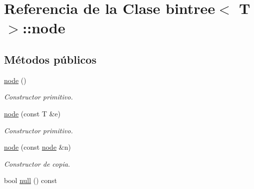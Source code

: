 \hypertarget{classbintree_1_1node}{}\section{Referencia de la Clase bintree$<$ T $>$\+:\+:node}
\label{classbintree_1_1node}
\subsection*{Métodos públicos}
\begin{DoxyCompactItemize}
\item 
\hyperlink{classbintree_1_1node_a099e9a8cc53532127865f00159195972}{node} ()\hypertarget{classbintree_1_1node_a099e9a8cc53532127865f00159195972}{}\label{classbintree_1_1node_a099e9a8cc53532127865f00159195972}

\begin{DoxyCompactList}\small\item\em Constructor primitivo. \end{DoxyCompactList}\item 
\hyperlink{classbintree_1_1node_a66bcf0ffb155dcdefaad1bb626c9333f}{node} (const T \&e)
\begin{DoxyCompactList}\small\item\em Constructor primitivo. \end{DoxyCompactList}\item 
\hyperlink{classbintree_1_1node_a1b2726b74c7059137057de34f6ce8cab}{node} (const \hyperlink{classbintree_1_1node}{node} \&n)
\begin{DoxyCompactList}\small\item\em Constructor de copia. \end{DoxyCompactList}\item 
bool \hyperlink{classbintree_1_1node_a9b3260cb12878a94f15b9806da984144}{null} () const \hypertarget{classbintree_1_1node_a9b3260cb12878a94f15b9806da984144}{}\label{classbintree_1_1node_a9b3260cb12878a94f15b9806da984144}


\end{DoxyCompactItemize}
